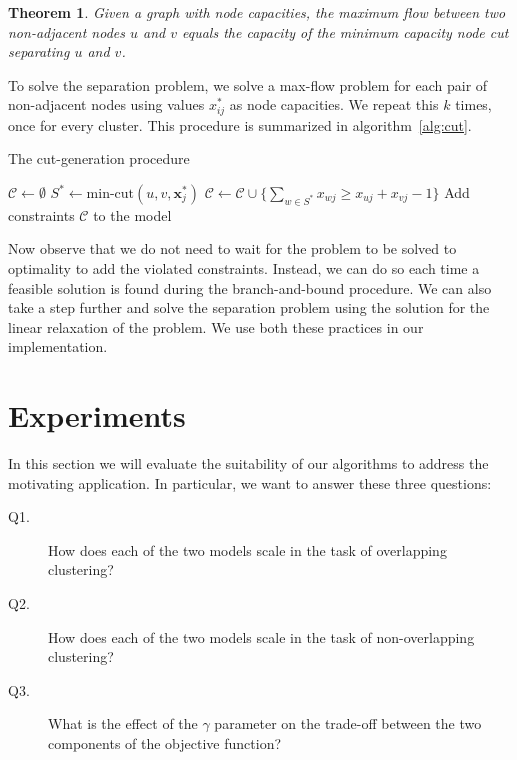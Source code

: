 \documentclass[conference,compsoc]{IEEEtran}
\newtheorem{theorem}{Theorem}
\begin{document}
\begin{theorem}
Given a graph with node capacities, the maximum flow between
two non-adjacent nodes $u$ and $v$ equals the capacity of the minimum
capacity node cut separating $u$ and $v$.
\end{theorem}

To solve the separation problem, we solve a max-flow problem for each
pair of non-adjacent nodes using values $x^*_{ij}$ as node capacities. We repeat this $k$ times, once for every cluster. This procedure is summarized in algorithm~\ref{alg:cut}.

\begin{algorithm}
\centering
\caption{The cut-generation procedure}
\label{alg:cut}
\begin{algorithmic}[1]
\State $\mathcal{C} \gets \emptyset$
		\State $S^* \gets \text{min-cut}(u, v, {\mathbf{x}}^{*}_j)$ 
			\State $\mathcal{C} \gets \mathcal{C} \cup \{\sum_{w \in S^*} x_{wj} \geq x_{uj} + x_{vj} - 1\}$ 
		\EndIf
	\EndFor
\EndFor
\State Add constraints $\mathcal{C}$ to the model
\end{algorithmic}
\end{algorithm}

Now observe that we do not need to wait for the problem to be solved to
optimality to add the violated constraints. Instead, we can do so each
time a feasible solution is found during the branch-and-bound procedure.
We can also take a step further and solve the separation problem using
the solution for the linear relaxation of the problem. We use both these
practices in our implementation.

\section{Experiments}
\label{sec:experiments}

In this section we will evaluate the suitability of our algorithms to address the motivating application. In particular, we want to answer these three questions:

\begin{description}
\item[Q1.] How does each of the two models scale in the task of overlapping clustering?
\item[Q2.] How does each of the two models scale in the task of non-overlapping clustering?
\item[Q3.] What is the effect of the $\gamma$ parameter on the trade-off between the two components of the objective function?
\end{description}
\end{document}
